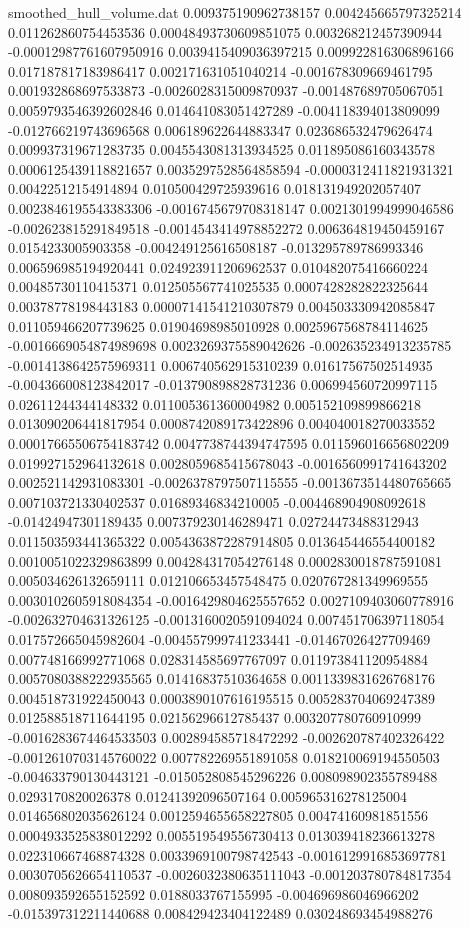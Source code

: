 \begin{filecontents}{smoothed_hull_volume.dat}
0.009375190962738157	0.004245665797325214	0.011262860754453536	0.00048493730609851075	0.003268212457390944	-0.00012987761607950916	0.0039415409036397215	0.009922816306896166	0.017187817183986417	0.002171631051040214	-0.001678309669461795	0.001932868697533873	-0.0026028315009870937	-0.001487689705067051	0.0059793546392602846	0.014641083051427289	-0.004118394013809099	-0.012766219743696568	0.006189622644883347	0.023686532479626474
0.009937319671283735	0.0045543081313934525	0.011895086160343578	0.0006125439118821657	0.0035297528564858594	-0.0000312411821931321	0.00422512154914894	0.010500429725939616	0.018131949202057407	0.0023846195543383306	-0.0016745679708318147	0.0021301994999046586	-0.002623815291849518	-0.0014543414978852272	0.006364819450459167	0.0154233005903358	-0.004249125616508187	-0.013295789786993346	0.006596985194920441	0.024923911206962537
0.010482075416660224	0.00485730110415371	0.012505567741025535	0.0007428282822325644	0.00378778198443183	0.00007141541210307879	0.004503330942085847	0.011059466207739625	0.01904698985010928	0.0025967568784114625	-0.0016669054874989698	0.0023269375589042626	-0.002635234913235785	-0.0014138642575969311	0.006740562915310239	0.01617567502514935	-0.004366008123842017	-0.013790898828731236	0.006994560720997115	0.02611244344148332
0.011005361360004982	0.005152109899866218	0.013090206441817954	0.0008742089173422896	0.004040018270033552	0.00017665506754183742	0.0047738744394747595	0.011596016656802209	0.019927152964132618	0.0028059685415678043	-0.0016560991741643202	0.002521142931083301	-0.0026378797507115555	-0.0013673514480765665	0.007103721330402537	0.01689346834210005	-0.004468904908092618	-0.01424947301189435	0.007379230146289471	0.02724473488312943
0.011503593441365322	0.0054363872287914805	0.013645446554400182	0.0010051022329863899	0.004284317054276148	0.0002830018787591081	0.005034626132659111	0.012106653457548475	0.020767281349969555	0.0030102605918084354	-0.0016429804625557652	0.0027109403060778916	-0.002632704631326125	-0.0013160020591094024	0.007451706397118054	0.017572665045982604	-0.004557999741233441	-0.01467026427709469	0.007748166992771068	0.028314585697767097
0.011973841120954884	0.0057080388222935565	0.01416837510364658	0.0011339831626768176	0.004518731922450043	0.0003890107616195515	0.005283704069247389	0.012588518711644195	0.02156296612785437	0.003207780760910999	-0.0016283674464533503	0.002894585718472292	-0.002620787402326422	-0.0012610703145760022	0.007782269551891058	0.018210069194550503	-0.004633790130443121	-0.015052808545296226	0.008098902355789488	0.0293170820026378
0.01241392096507164	0.005965316278125004	0.014656802035626124	0.0012594655658227805	0.00474160981851556	0.0004933525838012292	0.005519549556730413	0.013039418236613278	0.022310667468874328	0.0033969100798742543	-0.0016129916853697781	0.0030705626654110537	-0.0026032380635111043	-0.001203780784817354	0.008093592655152592	0.0188033767155995	-0.004696986046966202	-0.015397312211440688	0.008429423404122489	0.030248693454988276

\end{filecontents}
